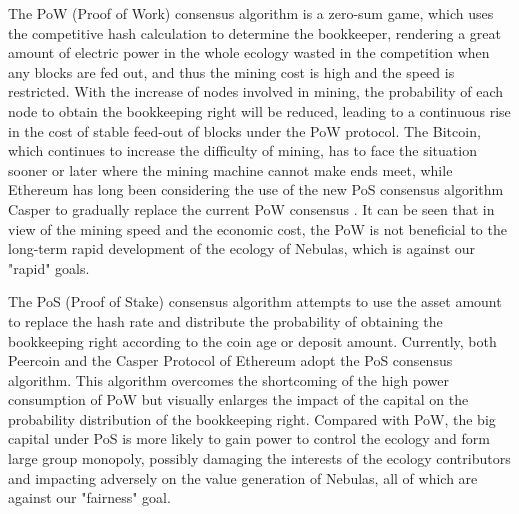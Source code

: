 The PoW (Proof of Work) consensus algorithm is a zero-sum game, which uses the competitive hash calculation to determine the bookkeeper, rendering a great amount of electric power in the whole ecology wasted in the competition when any blocks are fed out, and thus the mining cost is high and the speed is restricted. With the increase of nodes involved in mining, the probability of each node to obtain the bookkeeping right will be reduced, leading to a continuous rise in the cost of stable feed-out of blocks under the PoW protocol. The Bitcoin, which continues to increase the difficulty of mining, has to face the situation sooner or later where the mining machine cannot make ends meet, while Ethereum has long been considering the use of the new PoS consensus algorithm Casper \cite{casper} to gradually replace the current PoW consensus \cite{buterin2013ethereum}. It can be seen that in view of the mining speed and the economic cost, the PoW is not beneficial to the long-term rapid development of the ecology of Nebulas, which is against our "rapid" goals.


The PoS (Proof of Stake) consensus algorithm attempts to use the asset amount to replace the hash rate and distribute the probability of obtaining the bookkeeping right according to the coin age or deposit amount. Currently, both Peercoin \cite{king2012peercoin} and the Casper Protocol of Ethereum adopt the PoS consensus algorithm. This algorithm overcomes the shortcoming of the high power consumption of PoW but visually enlarges the impact of the capital on the probability distribution of the bookkeeping right. Compared with PoW, the big capital under PoS is more likely to gain power to control the ecology and form large group monopoly, possibly damaging the interests of the ecology contributors and impacting adversely on the value generation of Nebulas, all of which are against our "fairness" goal.


